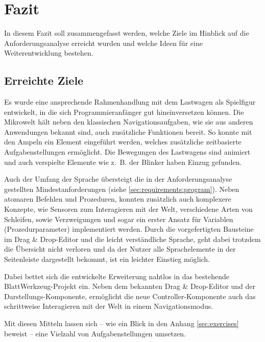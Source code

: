 \chapter{Fazit}
\label{sec:conclusion}

In diesem Fazit soll zusammengefasst werden, welche Ziele im Hinblick auf die Anforderungsanalyse erreicht wurden und welche Ideen für eine Weiterentwicklung bestehen.

\section{Erreichte Ziele}
\label{sec:conclusion:archived}

Es wurde eine ansprechende Rahmenhandlung mit dem Lastwagen als Spielfigur entwickelt, in die sich Programmieranfänger gut hineinversetzen können. Die Mikrowelt hält neben den klassischen Navigationsaufgaben, wie sie aus anderen Anwendungen bekannt sind, auch zusätzliche Funktionen bereit. So konnte mit den Ampeln ein Element eingeführt werden, welches zusätzliche zeitbasierte Aufgabenstellungen ermöglicht. Die Bewegungen des Lastwagens sind animiert und auch verspielte Elemente wie z.~B. der Blinker haben Einzug gefunden.

Auch der Umfang der Sprache übersteigt die in der Anforderungsanalyse gestellten Mindestanforderungen (siehe \ref{sec:requirements:program}). Neben atomaren Befehlen und Prozeduren, konnten zusätzlich auch komplexere Konzepte, wie Sensoren zum Interagieren mit der Welt, verschiedene Arten von Schleifen, sowie Verzweigungen und sogar ein erster Ansatz für Variablen (Prozedurparameter) implementiert werden. Durch die vorgefertigten Bausteine im Drag \& Drop-Edi\-tor und die leicht verständliche Sprache, geht dabei trotzdem die Übersicht nicht verloren und da der Nutzer alle Sprachelemente in der Seitenleiste dargestellt bekommt, ist ein leichter Einstieg möglich.

Dabei bettet sich die entwickelte Erweiterung nahtlos in das bestehende Blatt\-Werk\-zeug-Pro\-jekt ein. Neben dem bekannten Drag \& Drop-Edi\-tor und der Dar\-stell\-ungs-Kom\-po\-nen\-te, ermöglicht die neue Con\-trol\-ler-Kom\-po\-nen\-te auch das schrittweise Interagieren mit der Welt in einem Navigationsmodus.

Mit diesen Mitteln lassen sich -- wie ein Blick in den Anhang \ref{sec:exercises} beweist -- eine Vielzahl von Aufgabenstellungen umsetzen.

